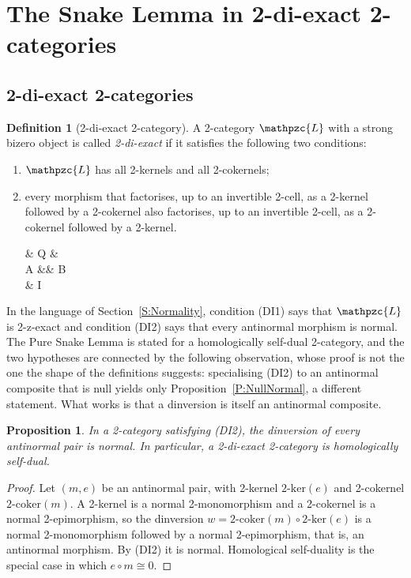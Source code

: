 \documentclass[reqno,a4paper]{amsart}
\numberwithin{equation}{section}
\theoremstyle{plain}
\newtheorem{proposition}[subsection]{Proposition}
\theoremstyle{definition}
\newtheorem{definition}[subsection]{Definition}
\newenvironment{enum}{\begin{enumerate}[label=\((\)\hspace{0.12ex}\roman*\hspace{0.075ex}\()\)]}{\end{enumerate}}
\def\nameit#1{\textrm{#1}~}
\def\prox{\nameit{Proposition}}
\def\dfn#1{{\itshape #1}}
\newcommand{\comp}{\circ}
\newcommand{\iso}{\cong}
\newcommand{\catfont}[1]{\ensuremath{\mathpzc{#1}}\xspace}
\def\L{\catfont{L}}
\renewcommand{\1}{\onecat{1}}
\newcommand{\twoker}{\ensuremath{2\text{-}\mathrm{ker}}}
\newcommand{\twocoker}{\ensuremath{2\text{-}\mathrm{coker}}}
\begin{document}
\section{The Snake Lemma in 2-di-exact 2-categories}\label{S:Snake}

\subsection{2-di-exact 2-categories}\label{SS:DiExact}

\begin{definition}[2-di-exact 2-category]\label{Def:DiExact}
	A 2-category \(\L\) with a strong bizero object is called \dfn{2-di-exact} if it satisfies the following two conditions:
	\begin{enum}
		\item[\textup{(DI1)}] \(\L\) has all 2-kernels and all 2-cokernels;
		\item[\textup{(DI2)}] every morphism that factorises, up to an invertible 2-cell, as a 2-kernel followed by a 2-cokernel also factorises, up to an invertible 2-cell, as a 2-cokernel followed by a 2-kernel.
		\begin{cd}[2.5]
			\& Q \& \\
			A \&\& B \\
			\& I
			\arrow["e", two heads, from=1-2, to=2-3]
			\arrow["m", tail, from=2-1, to=1-2]
			\arrow[iso, from=2-1, to=2-3]
			\arrow["{e'}"', dashed, two heads, from=2-1, to=3-2]
			\arrow["{m'}"', dashed, tail, from=3-2, to=2-3]
		\end{cd}
	\end{enum}
\end{definition}

In the language of Section~\ref{S:Normality}, condition (DI1) says that \(\L\) is 2-z-exact and condition (DI2) says that every antinormal morphism is normal. The Pure Snake Lemma is stated for a homologically self-dual 2-category, and the two hypotheses are connected by the following observation, whose proof is not the one the shape of the definitions suggests: specialising (DI2) to an antinormal composite that is null yields only \prox\ref{P:NullNormal}, a different statement. What works is that a dinversion is itself an antinormal composite.

\begin{proposition}\label{P:DiExactHSD}
	In a 2-category satisfying \textup{(DI2)}, the dinversion of every antinormal pair is normal. In particular, a 2-di-exact 2-category is homologically self-dual.
\end{proposition}
\begin{proof}
	Let \((m,e)\) be an antinormal pair, with 2-kernel \(\twoker(e)\) and 2-cokernel \(\twocoker(m)\). A 2-kernel is a normal 2-monomorphism and a 2-cokernel is a normal 2-epimorphism, so the dinversion \(w=\twocoker(m)\comp\twoker(e)\) is a normal 2-monomorphism followed by a normal 2-epimorphism, that is, an antinormal morphism. By \textup{(DI2)} it is normal. Homological self-duality is the special case in which \(e\comp m\iso 0\).
\end{proof}
\end{document}

